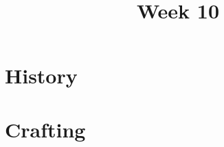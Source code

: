 \documentclass[11pt]{article}
\title{Week 10}
\date{}
\begin{document}
    \maketitle

    \section*{History}
        \begin{itemize}
        \end{itemize}

    \section*{Crafting}
        \begin{itemize}
        \end{itemize}
\end{document}
